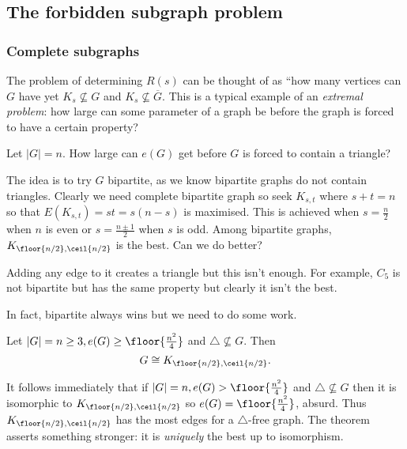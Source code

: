 \documentclass[a4paper]{article}
\begin{document}
\subsection{The forbidden subgraph problem}

\subsubsection{Complete subgraphs}

The problem of determining \(R(s)\) can be thought of as ``how many vertices can \(G\) have yet \(K_s \nsubseteq G\) and \(K_s \nsubseteq \overline G\). This is a typical example of an \emph{extremal problem}: how large can some parameter of a graph be before the graph is forced to have a certain property?

\begin{eg}
  Let \(|G| = n\). How large can \(e(G)\) get before \(G\) is forced to contain a triangle?
\end{eg}

The idea is to try \(G\) bipartite, as we know bipartite graphs do not contain triangles. Clearly we need complete bipartite graph so seek \(K_{s, t}\) where \(s + t = n\) so that \(E(K_{s, t}) = st = s(n - s)\) is maximised. This is achieved when \(s = \frac{n}{2}\) when \(n\) is even or \(s = \frac{n \pm 1}{2}\) when \(s\) is odd. Among bipartite graphs, \(K_{\floor{n/2}, \ceil{n/2}}\) is the best. Can we do better?

Adding any edge to it creates a triangle but this isn't enough. For example, \(C_5\) is not bipartite but has the same property but clearly it isn't the best.
\begin{center}
\end{center}

In fact, bipartite always wins but we need to do some work.

\begin{proposition}
  Let \(|G| = n \geq 3, e(G) \geq \floor{\frac{n^2}{4}}\) and \(\triangle \nsubseteq G\). Then
  \[
    G \cong K_{\floor{n/2}, \ceil{n/2}}.
  \]
\end{proposition}

\begin{remark}
  It follows immediately that if \(|G| = n, e(G) > \floor{\frac{n^2}{4}}\) and \(\triangle \nsubseteq G\) then it is isomorphic to \(K_{\floor{n/2}, \ceil{n/2}}\) so \(e(G) = \floor{\frac{n^2}{4}}\), absurd. Thus \(K_{\floor{n/2}, \ceil{n/2}}\) has the most edges for a \(\triangle\)-free graph. The theorem asserts something stronger: it is \emph{uniquely} the best up to isomorphism.
\end{remark}
\end{document}
